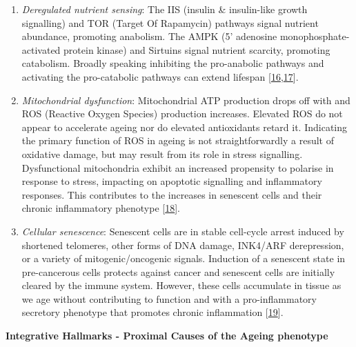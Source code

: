 \documentclass[
]{book}
\begin{document}
\begin{enumerate}
\def\labelenumi{\arabic{enumi}.}
\setcounter{enumi}{4}
\item
  \emph{Deregulated nutrient sensing}:
  The IIS (insulin \& insulin-like growth signalling) and TOR (Target Of Rapamycin) pathways signal nutrient abundance, promoting anabolism.
  The AMPK (5' adenosine monophosphate-activated protein kinase) and Sirtuins signal nutrient scarcity, promoting catabolism.
  Broadly speaking inhibiting the pro-anabolic pathways and activating the pro-catabolic pathways can extend lifespan {[}\protect\hyperlink{ref-Johnson2018}{16},\protect\hyperlink{ref-Soultoukis2016}{17}{]}.
\item
  \emph{Mitochondrial dysfunction}:
  Mitochondrial ATP production drops off with and ROS (Reactive Oxygen Species) production increases. Elevated ROS do not appear to accelerate ageing nor do elevated antioxidants retard it.
  Indicating the primary function of ROS in ageing is not straightforwardly a result of oxidative damage, but may result from its role in stress signalling.
  Dysfunctional mitochondria exhibit an increased propensity to polarise in response to stress, impacting on apoptotic signalling and inflammatory responses.
  This contributes to the increases in senescent cells and their chronic inflammatory phenotype {[}\protect\hyperlink{ref-Payne2015}{18}{]}.
\item
  \emph{Cellular senescence}:
  Senescent cells are in stable cell-cycle arrest induced by shortened telomeres, other forms of DNA damage, INK4/ARF derepression, or a variety of mitogenic/oncogenic signals.
  Induction of a senescent state in pre-cancerous cells protects against cancer and senescent cells are initially cleared by the immune system.
  However, these cells accumulate in tissue as we age without contributing to function and with a pro-inflammatory secretory phenotype that promotes chronic inflammation {[}\protect\hyperlink{ref-Avelar2020}{19}{]}.
\end{enumerate}

\textbf{Integrative Hallmarks - Proximal Causes of the Ageing phenotype}
\end{document}
